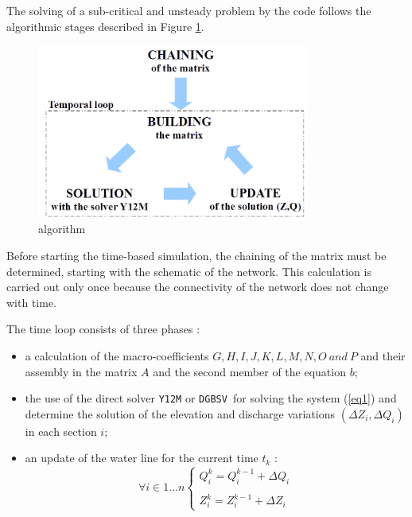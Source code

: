 The solving of a sub-critical and unsteady problem by the \REZO{} code follows the algorithmic stages described in Figure \ref{fig:Etap}.

\begin{figure}[H]
 \begin{center}
  \includegraphics[width=0.8\textwidth]{Figures/AlgoRezo.png}
  \caption{\REZO{} algorithm}
  \label{fig:Etap}
 \end{center}
\end{figure}

Before starting the time-based simulation, the chaining of the matrix must be determined, starting with the schematic of the network. This calculation is carried out only once because the connectivity of the network does not change with time.

The time loop consists of three phases :
\begin{itemize}
 \item a calculation of the macro-coefficients $G, H, I, J, K, L, M, N, O\ and\ P$ and their assembly in the matrix $A$ and the second member of the equation $b$;
 \item the use of the direct solver \texttt{Y12M} or \texttt{DGBSV }for solving the system (\ref{eq1}) and determine the solution of the elevation and discharge variations $(\Delta Z_i,\Delta Q_i)$ in each section $i$;
 \item an update of the water line for the current time $t_k$ :
  \begin{equation}
   \forall i \in 1...n
   \left \lbrace
  \begin{array}{l}
    Q_{i}^{k} = Q_{i}^{k-1} + \Delta Q_i \\
    \\
    Z_{i}^{k} = Z_{i}^{k-1} + \Delta Z_i
  \end{array}
 \right.
  \end{equation}
\end{itemize}

